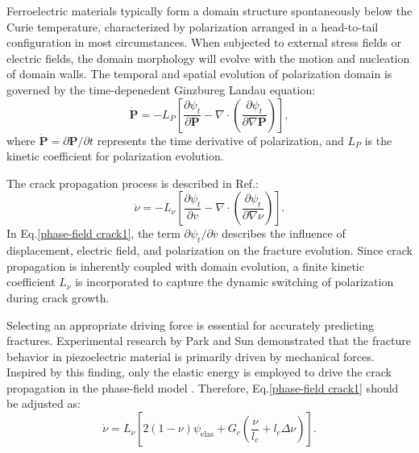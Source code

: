 \documentclass[final,times,fleqn,11pt]{elsarticle}
\begin{document}
Ferroelectric materials typically form a domain structure spontaneously below the Curie temperature, characterized by polarization arranged in a head-to-tail configuration in most circumstances. When subjected to external stress fields or electric fields, the domain morphology will evolve with the motion and nucleation of domain walls. The temporal and spatial evolution of polarization domain is governed by the time-depenedent Ginzbureg Landau equation:
\begin{equation}\label{TDGL}
    \dot{\mathbf{P}}=-L_P\left[ \frac{\partial \psi_t}{\partial \mathbf{P}}-\nabla \cdot \left( \frac{\partial\psi_t}{\partial \nabla\mathbf{P}} \right) \right],
\end{equation}
where $\dot{\mathbf{P}}=\partial \mathbf{P}/\partial t$ represents the time derivative of polarization, and $L_P$ is the kinetic coefficient for polarization evolution. 

The crack propagation process is described in Ref.\cite{abdollahi_phase-field_2011}:
\begin{equation}\label{phase-field crack1}
    \dot{\nu}=-L_\nu \left[ \frac{\partial\psi_t}{\partial v}-\nabla \cdot \left( \frac{\partial \psi_t}{\partial \nabla \nu} \right) \right].
\end{equation}
In Eq.\eqref{phase-field crack1}, the term $\partial\psi_t/\partial v$ describes the influence of displacement, electric field, and polarization on the fracture evolution. Since crack propagation is inherently coupled with domain evolution, a finite kinetic coefficient $L_\nu$ is incorporated to capture the dynamic switching of polarization during crack growth.

Selecting an appropriate driving force is essential for accurately predicting fractures. Experimental research by Park and Sun \cite{park_fracture_1995} demonstrated that the fracture behavior in piezoelectric material is primarily driven by mechanical forces. Inspired by this finding, only the elastic energy is employed to drive the crack propagation in the phase-field model \cite{wu_phase-field_2021}. Therefore, Eq.\eqref{phase-field crack1} should be adjusted as:
\begin{equation}\label{phase-field crack2}
    \dot{\nu}=L_\nu\left[ 2(1-\nu) \psi_\mathrm{elas}+G_c\left(\frac{\nu}{l_c} +l_c\Delta \nu\right) \right].
\end{equation}
\end{document}
